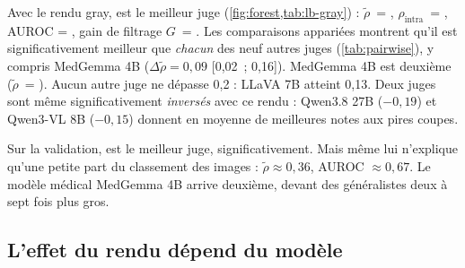 \documentclass[11pt,a4paper]{article}
\newcommand{\tablefile}[1]{{\footnotesize\setlength{\tabcolsep}{4pt}\adjustbox{max width=\textwidth}{}}}
\newcommand{\rhot}{\tilde{\rho}}
\begin{document}
\begin{table}[t]
\centering
\caption{Leaderboard de la validation, rendu gray. Couv. : part des 810 images notées sans erreur ; $\sigma$ : écart-type des notes ; $\rho$ : corrélation orientée avec la MAE de la coupe [IC 95\,\%] ; $\rho_\text{intra}$ : à anatomie égale ; $\rho_\text{gén}$ : au niveau des 10 générateurs ; gain du filtrage à 50\,\% ; latence médiane par image.}
\label{tab:lb-gray}
\tablefile{leaderboard_val_gray}
\end{table}

\begin{table}[t]
\centering
\caption{Leaderboard de la validation, rendu rgb3 (mêmes colonnes que le \cref{tab:lb-gray}).}
\label{tab:lb-rgb3}
\tablefile{leaderboard_val_rgb3}
\end{table}

Avec le rendu gray, \textbf{\bestVal{}} est le meilleur juge (\cref{fig:forest,tab:lb-gray}) : $\rhot$~= \bestValRho{}, $\rho_\text{intra}$~= \bestValIntra{}, AUROC = \bestValAuroc{}, gain de filtrage $G$~= \bestValGain{}. Les comparaisons appariées montrent qu'il est significativement meilleur que \emph{chacun} des neuf autres juges (\cref{tab:pairwise}), y compris MedGemma 4B ($\Delta\rhot = 0{,}09$ [0,02~; 0,16]). MedGemma 4B est deuxième ($\rhot$~= \medValRho{}). Aucun autre juge ne dépasse 0,2 : LLaVA 7B atteint 0,13. Deux juges sont même significativement \emph{inversés} avec ce rendu : Qwen3.8 27B ($-0{,}19$) et Qwen3-VL 8B ($-0{,}15$) donnent en moyenne de meilleures notes aux pires coupes.

\begin{table}[H]
\centering
\caption{Comparaisons appariées avec le meilleur juge (validation, gray) : différence de corrélation orientée et IC 95\,\% bootstrap (mêmes images, mêmes tirages de patients).}
\label{tab:pairwise}
\tablefile{pairwise}
\end{table}

\begin{retenir}
Sur la validation, \bestVal{} est le meilleur juge, significativement. Mais même lui n'explique qu'une petite part du classement des images : $\rhot \approx 0{,}36$, AUROC $\approx 0{,}67$. Le modèle médical MedGemma 4B arrive deuxième, devant des généralistes deux à sept fois plus gros.
\end{retenir}

\subsection{L'effet du rendu dépend du modèle}
\label{sec:rendu-res}
\end{document}
